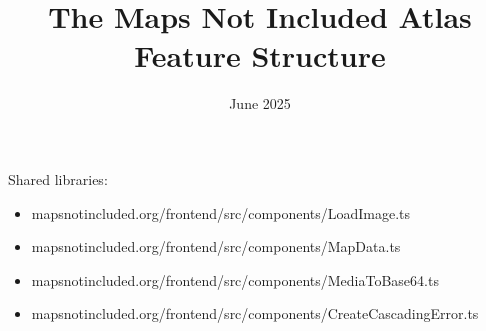 \documentclass{article}
\begin{document}
\title{The Maps Not Included Atlas Feature Structure}

\date{June 2025}

\maketitle

Shared libraries:

\begin{itemize}
    \item mapsnotincluded.org/frontend/src/components/LoadImage.ts
    \item mapsnotincluded.org/frontend/src/components/MapData.ts
    \item mapsnotincluded.org/frontend/src/components/MediaToBase64.ts
    \item mapsnotincluded.org/frontend/src/components/CreateCascadingError.ts
\end{itemize}
\end{document}
